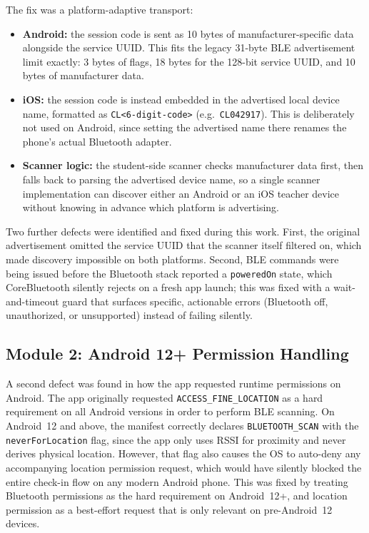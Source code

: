 \documentclass[12pt,a4paper]{report}
\begin{document}
The fix was a platform-adaptive transport:
\begin{itemize}
  \item \textbf{Android:} the session code is sent as 10 bytes of manufacturer-specific data alongside the service UUID. This fits the legacy 31-byte BLE advertisement limit exactly: 3 bytes of flags, 18 bytes for the 128-bit service UUID, and 10 bytes of manufacturer data.
  \item \textbf{iOS:} the session code is instead embedded in the advertised local device name, formatted as \texttt{CL<6-digit-code>} (e.g.\ \texttt{CL042917}). This is deliberately not used on Android, since setting the advertised name there renames the phone's actual Bluetooth adapter.
  \item \textbf{Scanner logic:} the student-side scanner checks manufacturer data first, then falls back to parsing the advertised device name, so a single scanner implementation can discover either an Android or an iOS teacher device without knowing in advance which platform is advertising.
\end{itemize}

Two further defects were identified and fixed during this work. First, the original advertisement omitted the service UUID that the scanner itself filtered on, which made discovery impossible on both platforms. Second, BLE commands were being issued before the Bluetooth stack reported a \texttt{poweredOn} state, which CoreBluetooth silently rejects on a fresh app launch; this was fixed with a wait-and-timeout guard that surfaces specific, actionable errors (Bluetooth off, unauthorized, or unsupported) instead of failing silently.

\subsection{Module 2: Android 12+ Permission Handling}
A second defect was found in how the app requested runtime permissions on Android. The app originally requested \texttt{ACCESS\_FINE\_LOCATION} as a hard requirement on all Android versions in order to perform BLE scanning. On Android~12 and above, the manifest correctly declares \texttt{BLUETOOTH\_SCAN} with the \texttt{neverForLocation} flag, since the app only uses RSSI for proximity and never derives physical location. However, that flag also causes the OS to auto-deny any accompanying location permission request, which would have silently blocked the entire check-in flow on any modern Android phone. This was fixed by treating Bluetooth permissions as the hard requirement on Android~12+, and location permission as a best-effort request that is only relevant on pre-Android~12 devices.
\end{document}
